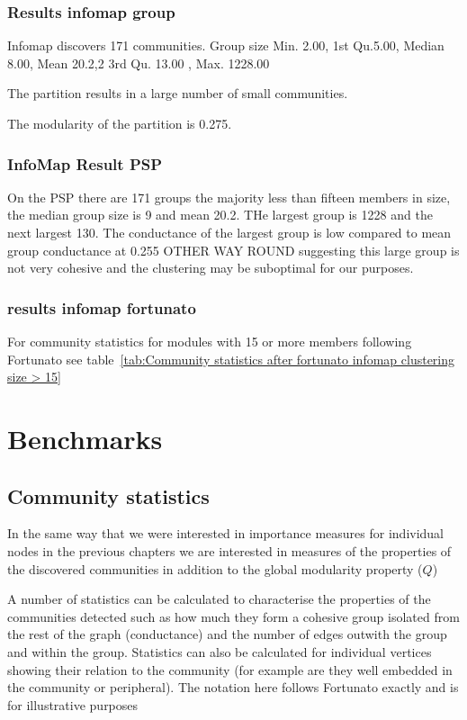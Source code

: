 \subsubsection{Results infomap group}
\label{sec:infomap_results}

Infomap discovers 171 communities. Group size  Min. 2.00, 1st  Qu.5.00,   Median 8.00,     Mean 20.2,2 3rd Qu. 13.00 ,  Max. 1228.00

The partition results in a large number of small communities. 

The modularity of the partition is 0.275.
\subsubsection{ InfoMap Result PSP}
On the PSP there are 171 groups the majority less than fifteen members in size, the median group size is 9 and mean 20.2. THe largest group is 1228 and the next largest 130. The conductance of the largest group is low compared to mean group conductance at 0.255 OTHER WAY ROUND  suggesting this large group is not very cohesive and the clustering may be suboptimal for our purposes. 

\subsubsection{results infomap fortunato}
For community statistics for modules with 15 or more members following Fortunato \cite{fortunato2016community} see table~\ref{tab:Community statistics after fortunato infomap clustering size > 15}



\section{Benchmarks}

\subsection{Community statistics}
\label{sec:Fortunato community statistics}

\cite{leskovec2010empirical}
In the same way that we were interested in importance measures for individual nodes in the previous chapters we are interested in measures of the properties of the discovered communities in addition to the global modularity property ($Q$)

A number of statistics can be calculated to characterise the properties of the communities detected such as how much they form a cohesive group isolated from the rest of the graph (conductance) and the number of edges outwith the group and within the group\cite{fortunato2016community}. Statistics can also be calculated for individual vertices showing their relation to the community (for example are they well embedded in the community or peripheral). The notation here follows Fortunato\cite{fortunato2016community} exactly and is for illustrative purposes 


